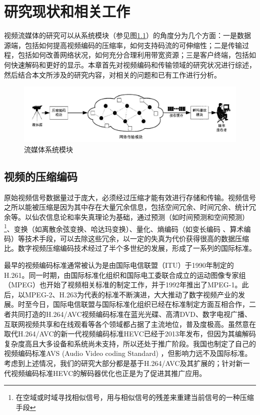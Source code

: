 \chapter{研究现状和相关工作}

视频流媒体的研究可以从系统模块（参见图\ref{fig:01}）的角度分为几个方面：一是数据源端，包括如何提高视频编码的压缩率，如何支持码流的可伸缩性；二是传输过程，包括如何改善网络状况，如何充分合理利用带宽资源；三是客户终端，包括如何快速解码和更好的显示。本章首先对视频编码和传输领域的研究状况进行综述，然后结合本文所涉及的研究内容，对相关的问题和已有工作进行分析。

\begin{figure}[h]
	\centering
	\includegraphics[width = 0.9\linewidth]{clip/01.png}
	\caption{流媒体系统模块 \label{fig:01}}
\end{figure}

\section{视频的压缩编码}

原始视频信号数据量过于庞大，必须经过压缩才能有效进行存储和传输。视频信号之所以能被压缩是因为其中存在大量冗余信息，包括空间冗余、时间冗余、统计冗余等\supercite{Gao-book-2010}。以仙农信息\supercite{Shannon-1948}论和率失真理论\supercite{Berger-book-1984}为基础，通过预测（如时间预测和空间预测）\footnote{在空域或时域寻找相似信号，用与相似信号的残差来重建当前信号的一种压缩手段}、变换（如离散余弦变换\supercite{Rao-1990}、哈达玛变换\supercite{Pratt-1969}）、量化\supercite{Gray-TIT1997}、熵编码（如变长编码\supercite{Huffman-1952} 、算术编码\supercite{Rissanen-1979}）等技术手段，可以去除这些冗余，以一定的失真为代价获得很高的数据压缩比。数字视频压缩编码技术经过了半个多世纪的发展，形成了一系列的国际标准。

最早的视频编码标准通常被认为是由国际电信联盟（ITU）于1990年制定的H.261\supercite{H.261}。同一时期，由国际标准化组织和国际电工委联合成立的运动图像专家组（MPEG）也开始了视频相关标准的制定工作，并于1992年推出了MPEG-1\supercite{MPEG1}。此后，以MPEG-2\supercite{MPEG2}、H.263\supercite{H.263}为代表的标准不断演进，大大推动了数字视频产业的发展。时至今日，国际电信联盟与国际标准化组织已经在标准制定方面互相合作，二者共同打造的H.264/AVC视频编码标准\supercite{H.264}在蓝光光碟、高清DVD、数字电视广播、互联网视频共享和在线观看等各个领域都占据了主流地位，普及度极高。虽然意在取代H.264/AVC的新一代视频编码标准HEVC已经于2013年发布，但因为其编解码复杂度高且大多设备和系统尚未支持，所以还处于推广阶段。我国也制定了自己的视频编码标准AVS (Audio Video coding Standard) \supercite{AVS}，但影响力远不及国际标准。考虑到上述情况，我们的研究大部分都是基于H.264/AVC及其扩展的；针对新一代视频编码标准HEVC的解码器优化也正是为了促进其推广应用。

